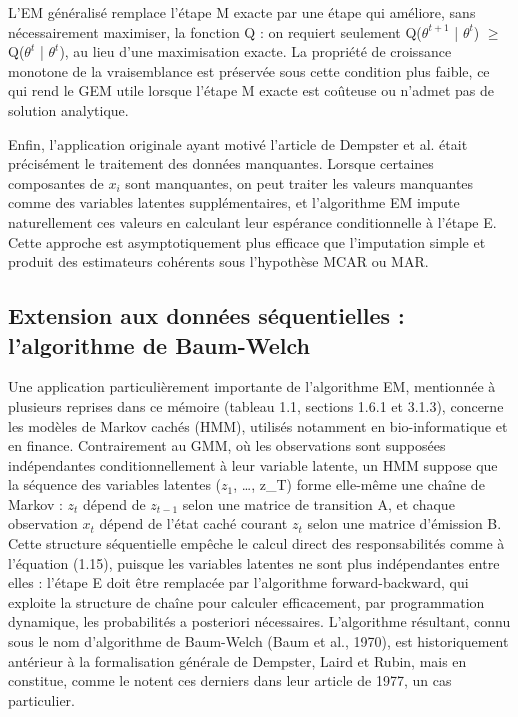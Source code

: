 L'EM généralisé remplace l'étape M exacte par une étape qui améliore, sans nécessairement maximiser, la fonction Q : on requiert seulement Q($\theta ^{t+1}$ | $\theta ^{t}$) $\geq $ Q($\theta ^{t}$ | $\theta ^{t}$), au lieu d'une maximisation exacte. La propriété de croissance monotone de la vraisemblance est préservée sous cette condition plus faible, ce qui rend le GEM utile lorsque l'étape M exacte est coûteuse ou n'admet pas de solution analytique.

Enfin, l'application originale ayant motivé l'article de Dempster et al. était précisément le traitement des données manquantes. Lorsque certaines composantes de $x_{i}$ sont manquantes, on peut traiter les valeurs manquantes comme des variables latentes supplémentaires, et l'algorithme EM impute naturellement ces valeurs en calculant leur espérance conditionnelle à l'étape E. Cette approche est asymptotiquement plus efficace que l'imputation simple et produit des estimateurs cohérents sous l'hypothèse MCAR ou MAR.

\subsection{Extension aux données séquentielles : l'algorithme de Baum-Welch}
Une application particulièrement importante de l'algorithme EM, mentionnée à plusieurs reprises dans ce mémoire (tableau 1.1, sections 1.6.1 et 3.1.3), concerne les modèles de Markov cachés (HMM), utilisés notamment en bio-informatique et en finance. Contrairement au GMM, où les observations sont supposées indépendantes conditionnellement à leur variable latente, un HMM suppose que la séquence des variables latentes ($z_{1}$, \ldots{}, z\_T) forme elle-même une chaîne de Markov : $z_{t}$ dépend de $z_{t-1}$ selon une matrice de transition A, et chaque observation $x_{t}$ dépend de l'état caché courant $z_{t}$ selon une matrice d'émission B. Cette structure séquentielle empêche le calcul direct des responsabilités comme à l'équation (1.15), puisque les variables latentes ne sont plus indépendantes entre elles : l'étape E doit être remplacée par l'algorithme forward-backward, qui exploite la structure de chaîne pour calculer efficacement, par programmation dynamique, les probabilités a posteriori nécessaires. L'algorithme résultant, connu sous le nom d'algorithme de Baum-Welch (Baum et al., 1970), est historiquement antérieur à la formalisation générale de Dempster, Laird et Rubin, mais en constitue, comme le notent ces derniers dans leur article de 1977, un cas particulier.

